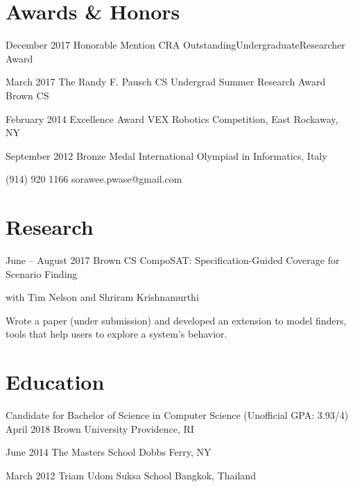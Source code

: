 \documentclass{tccv}
\begin{document}
\section{Awards \& Honors}

\begin{yearlist}
	\item{December 2017}
	{Honorable Mention}
	{CRA Outstanding\newline Undergraduate\newline Researcher Award}
	\item{March 2017}
	{The Randy F. Pausch CS Undergrad Summer \newline Research Award }
	{Brown CS}
	\item{February 2014}
	{Excellence Award}
	{VEX Robotics Competition, East Rockaway, NY}
	\item{September 2012}
	{Bronze Medal}
	{International Olympiad in Informatics, Italy}
\end{yearlist}

{(914) 920 1166}
{sorawee.pwase@gmail.com}

\section{Research}

\begin{eventlist}
	\item{June -- August 2017}
	{Brown CS}
	{CompoSAT: Specification-Guided \newline Coverage for Scenario Finding}
	
	with Tim Nelson and Shriram Krishnamurthi
	
	\vspace{3mm}
	
	Wrote a paper (under submission) and developed an extension to model finders, tools that help users to explore a system's behavior. 
	
\end{eventlist}

\section{Education}

\begin{yearlist}
	
	\item[Candidate for Bachelor of Science in Computer Science (Unofficial GPA: 3.93/4)]{April 2018}
	{Brown University}
	{Providence, RI}
	
	
	\item{June 2014}
	{The Masters School}
	{Dobbs Ferry, NY}
	
	\item{March 2012}
	{Triam Udom Suksa School}
	{Bangkok, Thailand}
	
\end{yearlist}
\end{document}
